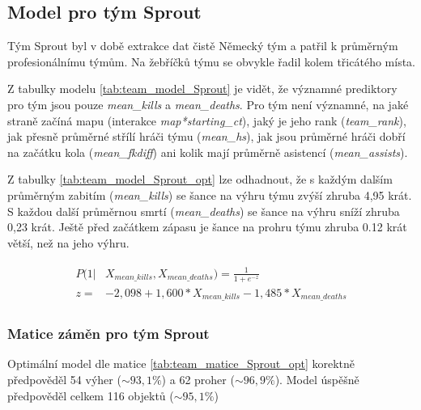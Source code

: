 

\subsection{Model pro tým Sprout}
Tým Sprout byl v době extrakce dat čistě Německý tým a patřil k průměrným profesionálnímu týmům. Na žebříčků týmu se obvykle řadil kolem třicátého místa.



Z tabulky modelu \ref{tab:team_model_Sprout} je vidět, že významné prediktory pro tým jsou pouze \textit{mean\_kills} a \textit{mean\_deaths}. Pro tým není významné,
na jaké straně začíná mapu (interakce \textit{map*starting\_ct}), jaký je jeho rank (\textit{team\_rank}), jak přesně průměrné střílí hráči týmu (\textit{mean\_hs}),
jak jsou průměrné hráči dobří na začátku kola (\textit{mean\_fkdiff}) ani kolik mají průměrně asistencí (\textit{mean\_assists}).



Z tabulky \ref{tab:team_model_Sprout_opt} lze odhadnout, že s každým dalším průměrným zabitím (\textit{mean\_kills}) se šance na výhru týmu zvýší zhruba 4,95 krát.
S každou další průměrnou smrtí (\textit{mean\_deaths}) se šance na výhru sníží zhruba 0,23 krát. Ještě před začátkem zápasu je šance na prohru týmu
zhruba 0.12 krát větší, než na jeho výhru.

\begin{align*}
    \begin{split}
        P(1 | &X_{mean\_kills},  X_{mean\_deaths}) = \frac{1}{1 + e^{-z}} \\
        z = &-2,098 + 1,600*X_{mean\_kills} - 1,485*X_{mean\_deaths}
    \end{split}
\end{align*}

\subsubsection{Matice záměn pro tým Sprout}



Optimální model dle matice \ref{tab:team_matice_Sprout_opt} korektně předpověděl 54 výher ($\sim 93,1\%$) a 62 proher ($\sim 96,9\%$). Model úspěšně předpověděl
celkem 116 objektů ($\sim 95,1\%$)



